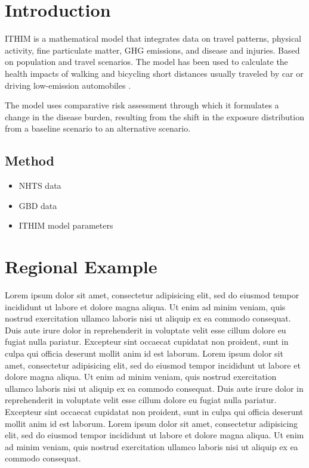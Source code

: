 \documentclass{bioinfo}
\begin{document}
\section{Introduction}

ITHIM is a mathematical model that integrates data on travel patterns,
physical activity, fine particulate matter, GHG emissions, and disease
and injuries. Based on population and travel scenarios. The model has
been used to calculate the health impacts of walking and bicycling
short distances usually traveled by car or driving low-emission
automobiles \cite{woodcock2013}.

The model uses comparative risk assessment through which it formulates
a change in the disease burden, resulting from the shift in the
exposure distribution from a baseline scenario to an alternative
scenario.

\begin{methods}
\section{Method}

\begin{itemize}
\item NHTS data
\item GBD data
\item ITHIM model parameters
\end{itemize}

\end{methods}

\section{Regional Example}




Lorem ipsum dolor sit amet, consectetur adipisicing elit, sed do
eiusmod tempor incididunt ut labore et dolore magna aliqua. Ut enim ad
minim veniam, quis nostrud exercitation ullamco laboris nisi ut
aliquip ex ea commodo consequat. Duis aute irure dolor in
reprehenderit in voluptate velit esse cillum dolore eu fugiat nulla
pariatur. Excepteur sint occaecat cupidatat non proident, sunt in
culpa qui officia deserunt mollit anim id est laborum. Lorem ipsum
dolor sit amet, consectetur adipisicing elit, sed do eiusmod tempor
incididunt ut labore et dolore magna aliqua. Ut enim ad minim veniam,
quis nostrud exercitation ullamco laboris nisi ut aliquip ex ea
commodo consequat. Duis aute irure dolor in reprehenderit in voluptate
velit esse cillum dolore eu fugiat nulla pariatur. Excepteur sint
occaecat cupidatat non proident, sunt in culpa qui officia deserunt
mollit anim id est laborum. Lorem ipsum dolor sit amet, consectetur
adipisicing elit, sed do eiusmod tempor incididunt ut labore et dolore
magna aliqua. Ut enim ad minim veniam, quis nostrud exercitation
ullamco laboris nisi ut aliquip ex ea commodo consequat.
\end{document}
